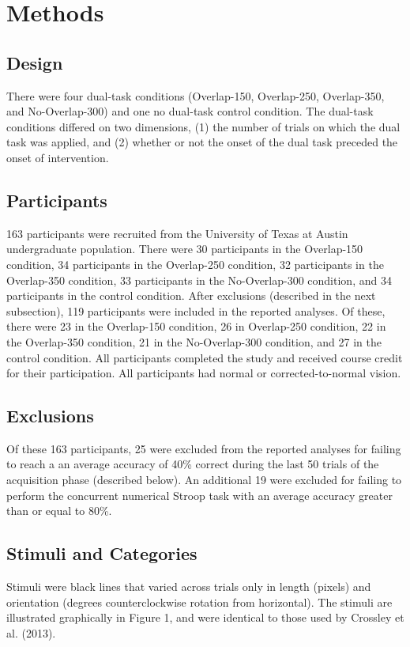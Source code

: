 \documentclass[apacite,draftfirst,man]{apa6}
\begin{document}
\section*{Methods}
\subsection*{Design} There were four dual-task conditions (Overlap-150,
Overlap-250, Overlap-350, and No-Overlap-300) and one no dual-task control
condition. The dual-task conditions differed on two dimensions, (1) the number
of trials on which the dual task was applied, and (2) whether or not the onset
of the dual task preceded the onset of intervention.

\subsection*{Participants} 163 participants were recruited from the University
of Texas at Austin undergraduate population. There were 30 participants in the
Overlap-150 condition, 34 participants in the Overlap-250 condition, 32
participants in the Overlap-350 condition, 33 participants in the No-Overlap-300
condition, and 34 participants in the control condition. After exclusions
(described in the next subsection), 119 participants were included in the
reported analyses. Of these, there were 23 in the Overlap-150 condition, 26 in
Overlap-250 condition, 22 in the Overlap-350 condition, 21 in the No-Overlap-300
condition, and 27 in the control condition. All participants completed the study
and received course credit for their participation. All participants had normal
or corrected-to-normal vision.

\subsection*{Exclusions}
Of these 163 participants, 25 were excluded from the reported analyses for
failing to reach a an average accuracy of 40\% correct during the last 50 trials
of the acquisition phase (described below). An additional 19 were excluded for
failing to perform the concurrent numerical Stroop task with an average accuracy
greater than or equal to 80\%.

\subsection*{Stimuli and Categories} Stimuli were black lines that varied across
trials only in length (pixels) and orientation (degrees counterclockwise
rotation from horizontal). The stimuli are illustrated graphically in Figure 1,
and were identical to those used by Crossley et al. (2013).
\end{document}
